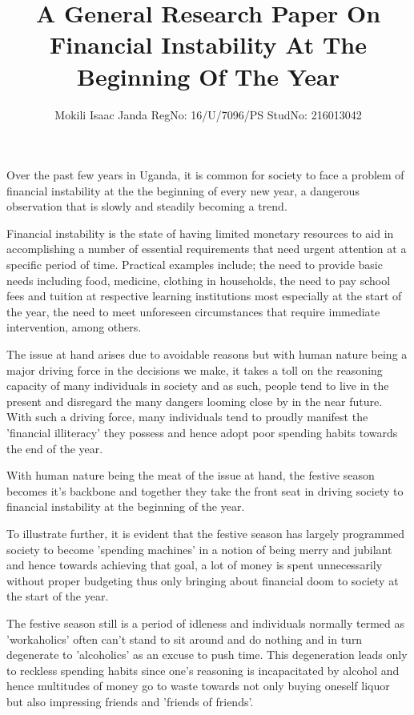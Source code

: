 \documentclass[12pt,a4paper]{article}
\author{Mokili Isaac Janda RegNo: 16/U/7096/PS StudNo: 216013042}
\title{A General Research Paper On Financial Instability At The Beginning Of The Year}
\begin{document}
\maketitle
Over the past few years in Uganda, it is common for society to face a problem of financial instability at the the beginning of every new year, a dangerous observation that is slowly and steadily becoming a trend.

Financial instability is the state of having limited monetary resources to aid in accomplishing a number of essential requirements that need urgent attention at a specific period of time. Practical examples include; the need to provide basic needs including food, medicine, clothing in households, the need to pay school fees and tuition at respective learning institutions most especially at the start of the year, the need to meet unforeseen circumstances that require immediate intervention, among others.

The issue at hand arises due to avoidable reasons but with human nature being a major driving force in the decisions we make, it takes a toll on the reasoning capacity of many individuals in society and as such, people tend to live in the present and disregard the many dangers looming close by in the near future. With such a driving force, many individuals tend to proudly manifest the 'financial illiteracy' they possess and hence adopt poor spending habits towards the end of the year. 

With human nature being the meat of the issue at hand, the festive season becomes it's backbone and together they take the front seat in driving society to financial instability at the beginning of the year. 

To illustrate further, it is evident that the festive season has largely programmed society to become 'spending machines' in a notion of being merry and jubilant and hence towards achieving that goal, a lot of money is spent unnecessarily without proper budgeting thus only bringing about financial doom to society at the start of the year.

The festive season still is a period of idleness and individuals normally termed as 'workaholics' often can't stand to sit around and do nothing and in turn degenerate to 'alcoholics' as an excuse to push time. This degeneration leads only to reckless spending habits since one's reasoning is incapacitated by alcohol and hence multitudes of money go to waste towards not only buying oneself liquor but also impressing friends and 'friends of friends'.
\end{document}
